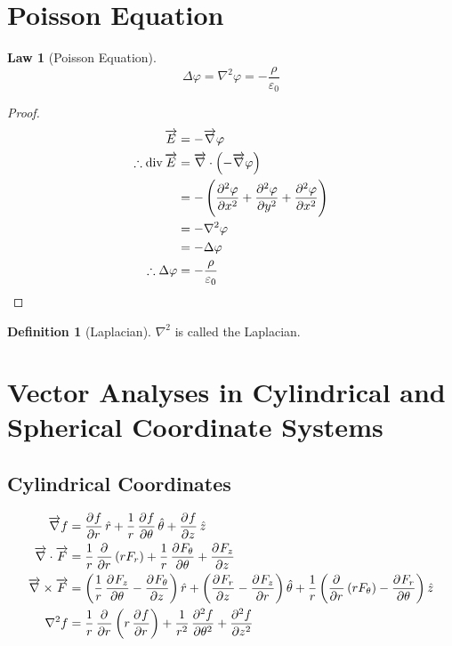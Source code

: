 \documentclass[fleqn, a4paper, 12pt, twoside]{article}
\theoremstyle{definition}
\newtheorem{definition}{Definition}
\theoremstyle{theorem}
\newtheorem{law}{Law}
\newcommand{\divergence}{\mathrm{div\,}}
\begin{document}
\section{Poisson Equation}

\begin{law}[Poisson Equation]
	\begin{equation*}
		\Delta \varphi = \nabla^2 \varphi = -\frac{\rho}{\varepsilon_0}
	\end{equation*}
\end{law}

\begin{proof}
	\begin{align*}
		\overrightarrow{E} &= -\overrightarrow{\nabla} \varphi\\
		\therefore \divergence \overrightarrow{E} &= \overrightarrow{\nabla} \cdot \left( -\overrightarrow{\nabla} \varphi \right)\\
		&= -\left( \dpd[2]{\varphi}{x} + \dpd[2]{\varphi}{y} + \dpd[2]{\varphi}{x} \right)\\
		&= -\nabla^2 \varphi\\
		&= -\Delta \varphi\\
		\therefore \Delta \varphi &= -\frac{\rho}{\varepsilon_0}
	\end{align*}
\end{proof}

\begin{definition}[Laplacian]
	$\nabla^2$ is called the Laplacian.
\end{definition}

\section{Vector Analyses in Cylindrical and Spherical Coordinate Systems}

\subsection{Cylindrical Coordinates}

\begin{align*}
	\overrightarrow{\nabla} f &= \dpd{f}{r} \hat{r} + \dfrac{1}{r} \dpd{f}{\theta} \hat{\theta} + \dpd{f}{z} \hat{z}\\
	\overrightarrow{\nabla} \cdot \overrightarrow{F} &= \dfrac{1}{r} \dpd{}{r} (r F_r) + \dfrac{1}{r} \dpd{F_{\theta}}{\theta} + \dpd{F_z}{z}\\
	\overrightarrow{\nabla} \times \overrightarrow{F} &= \left( \dfrac{1}{r} \dpd{F_z}{\theta} - \dpd{F_{\theta}}{z} \right) \hat{r} + \left( \dpd{F_r}{z} - \dpd{F_z}{r} \right) \hat{\theta} + \dfrac{1}{r} \left( \dpd{}{r} (r F_{\theta}) - \dpd{F_r}{\theta} \right) \hat{z}\\
	\nabla^2 f &= \dfrac{1}{r} \dpd{}{r} \left( r \dpd{f}{r} \right) + \dfrac{1}{r^2} \dpd[2]{f}{\theta} + \dpd[2]{f}{z}
\end{align*}
\end{document}
